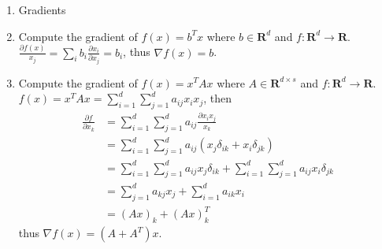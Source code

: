 \documentclass[10pt]{article}
\begin{document}
\begin{enumerate}
\ee

\item Gradients
\be
	\item Compute the gradient of $f(x) = b^T x$ where $b \in \mathbf{R}^d$ and $f: \mathbf{R}^d \rightarrow \mathbf{R}$.
	$\frac{\partial f(x)}{x_j} = \sum_i b_i \frac{\partial x_i} {\partial x_j} = b_i$, thus $\nabla f(x) = b$.
	\item Compute the gradient of $f(x) = x^T A x$ where $A \in  \mathbf{R}^{d \times s}$ and $f: \mathbf{R}^d \rightarrow \mathbf{R}$.
	$f(x)	=  x^T A x = \sum_{i=1}^d \sum_{j=1}^d a_{ij} x_i x_j$, then
	\begin{align*}
		\frac{\partial f} {\partial x_k}	&=	\sum_{i=1}^d \sum_{j=1}^d a_{ij} \frac {\partial x_i x_j} {x_k}\\
								&=	\sum_{i=1}^d \sum_{j=1}^d a_{ij} (x_j \delta_{ik} + x_i \delta_{jk}) \\
								&=	\sum_{i=1}^d \sum_{j=1}^d a_{ij} x_j \delta_{ik}  + \sum_{i=1}^d \sum_{j=1}^d a_{ij} x_i \delta_{jk} \\
								&=	\sum_{j=1}^d  a_{kj} x_j +  \sum_{i=1}^d a_{ik}  x_i \\
								&=	(A x)_k + (A x)_k^T
	\end{align*}
	thus $\nabla f(x) = (A + A^T) x$.
\ee

\end{enumerate}
\end{document}
